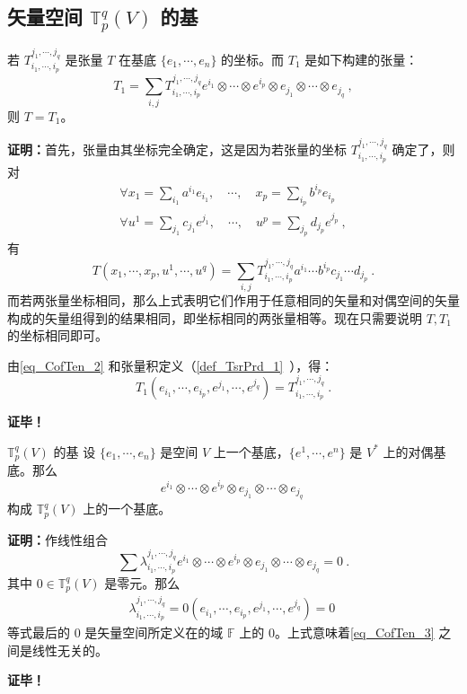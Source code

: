 \subsection{矢量空间 $\mathbb T^q_p(V)$ 的基}
\begin{theorem}{}\label{the_CofTen_1}
若 $T^{j_1,\cdots,j_q}_{i_1,\cdots,i_p}$ 是张量 $T$ 在基底 $\{e_1,\cdots,e_n\}$ 的坐标。而 $T_1$ 是如下构建的张量：
\begin{equation}\label{eq_CofTen_2}
T_1=\sum_{i,j}T^{j_1,\cdots,j_q}_{i_1,\cdots,i_p}e^{i_1}\otimes\cdots\otimes e^{i_p}\otimes e_{j_1}\otimes\cdots\otimes e_{j_q}~,
\end{equation}
则 $T=T_1$。
\end{theorem}
\textbf{证明：}首先，张量由其坐标完全确定，这是因为若张量的坐标 $T^{j_1,\cdots,j_q}_{i_1,\cdots,i_p}$ 确定了，则对
\begin{equation}
\begin{aligned}
\forall x_1=\sum_{i_1}a^{i_1}e_{i_1},\quad\cdots,\quad x_p=\sum_{i_p}b^{i_p}e_{i_p}\\
\forall u^1=\sum_{j_1}c_{j_1}e^{j_1},\quad\cdots,\quad u^p=\sum_{j_p}d_{j_p}e^{j_p}~,
\end{aligned}
\end{equation}
有 
\begin{equation}\label{eq_CofTen_1}
T(x_1,\cdots,x_p,u^1,\cdots,u^q)=\sum_{i,j}T^{j_1,\cdots,j_q}_{i_1,\cdots,i_p}a^{i_1}\cdots b^{i_p}c_{j_1}\cdots d_{j_p}~.
\end{equation}
而若两张量坐标相同，那么上式表明它们作用于任意相同的矢量和对偶空间的矢量构成的矢量组得到的结果相同，即坐标相同的两张量相等。现在只需要说明 $T,T_1$ 的坐标相同即可。

由\autoref{eq_CofTen_2} 和张量积定义（\autoref{def_TsrPrd_1}~），得：
\begin{equation}
T_1(e_{i_1},\cdots,e_{i_p},e^{j_1},\cdots,e^{j_q})=T^{j_1,\cdots,j_q}_{i_1,\cdots,i_p}~.
\end{equation}

\textbf{证毕！}
 \begin{theorem}{ $\mathbb T^q_p(V)$ 的基}\label{the_CofTen_2}
 设 $\{e_1,\cdots,e_n\}$ 是空间 $V$ 上一个基底，$\{e^1,\cdots,e^n\}$ 是 $V^*$ 上的对偶基底。那么
\begin{equation}\label{eq_CofTen_3}
e^{i_1}\otimes\cdots\otimes e^{i_p}\otimes e_{j_1}\otimes\cdots\otimes e_{j_q}~
\end{equation}
构成 $\mathbb T_p^q(V)$ 上的一个基底。 
 \end{theorem}
 \textbf{证明：}作线性组合
 \begin{equation}
 \sum\lambda^{j_1,\cdots,j_q}_{i_1,\cdots,i_p}e^{i_1}\otimes\cdots\otimes e^{i_p}\otimes e_{j_1}\otimes\cdots\otimes e_{j_q}=0~.
 \end{equation}
 其中 $0\in \mathbb T^q_p(V)$ 是零元。那么
 \begin{equation}
 \begin{aligned}
 \lambda^{j_1,\cdots,j_q}_{i_1,\cdots,i_p}=0(e_{i_1},\cdots,e_{i_p},e^{j_1},\cdots,e^{j_q})=0
 \end{aligned}
 ~
 \end{equation}
等式最后的 $0$ 是矢量空间所定义在的域 $\mathbb F$ 上的 $0$。上式意味着\autoref{eq_CofTen_3} 之间是线性无关的。

\textbf{证毕！}
